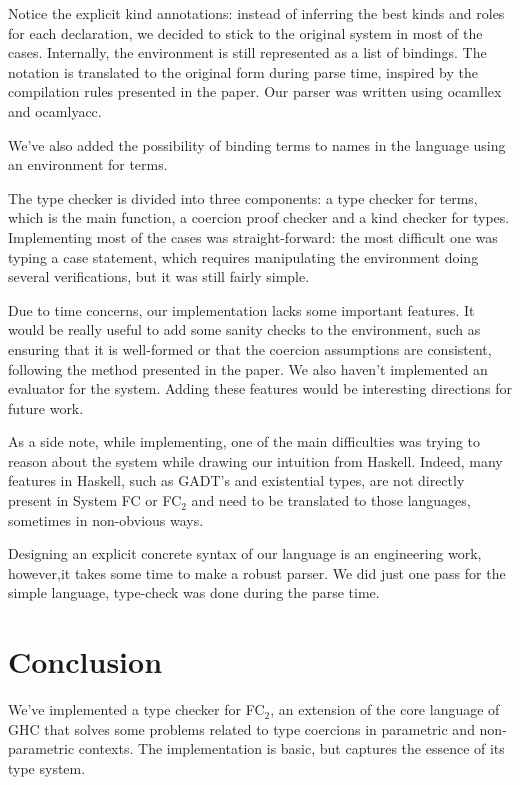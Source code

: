 \documentclass{article}
\newcommand{\fct}{FC\(_2\)\xspace}
\begin{document}
Notice the explicit kind annotations: instead of inferring the best
kinds and roles for each declaration, we decided to stick to the
original system in most of the cases. Internally, the environment is
still represented as a list of bindings. The notation is translated to
the original form during parse time, inspired by the compilation rules
presented in the paper. Our parser was written using ocamllex and
ocamlyacc.

We've also added the possibility of binding terms to names in the
language using an environment for terms.

The type checker is divided into three components: a type checker for
terms, which is the main function, a coercion proof checker and a kind
checker for types. Implementing most of the cases was
straight-forward: the most difficult one was typing a case statement,
which requires manipulating the environment doing several
verifications, but it was still fairly simple.

Due to time concerns, our implementation lacks some important
features. It would be really useful to add some sanity checks to the
environment, such as ensuring that it is well-formed or that the
coercion assumptions are consistent, following the method presented in
the paper. We also haven't implemented an evaluator for the
system. Adding these features would be interesting directions for
future work.

As a side note, while implementing, one of the main difficulties was
trying to reason about the system while drawing our intuition from
Haskell. Indeed, many features in Haskell, such as GADT's and
existential types, are not directly present in System FC or \fct and
need to be translated to those languages, sometimes in non-obvious ways.

Designing an explicit concrete syntax of our language is an
engineering work, however,it takes some time to make a robust
parser. We did just one pass for the simple language, type-check was
done during the parse time.
\section{Conclusion}

We've implemented a type checker for \fct, an extension of the core
language of GHC that solves some problems related to type coercions in
parametric and non-parametric contexts. The implementation is 
basic, but captures the essence of its type system.

{}

\end{document}
